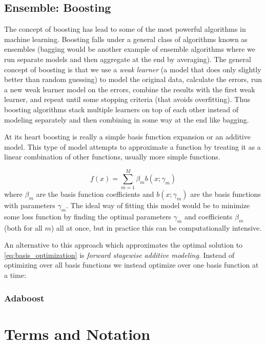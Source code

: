 \documentclass[paper=a4, fontsize=11pt]{scrartcl} %
\numberwithin{equation}{section} %
\numberwithin{figure}{section} %
\numberwithin{table}{section} %
\begin{document}
\subsection{Ensemble: Boosting}

The concept of boosting has lead to some of the most powerful algorithms in machine learning. Boosting falls under a general class of algorithms known as ensembles (bagging would be another example of ensemble algorithms where we run separate models and then aggregate at the end by averaging). The general concept of boosting is that we use a \emph{weak learner} (a model that does only slightly better than random guessing) to model the original data, calculate the errors, run a new weak learner model on the errors, combine the results with the first weak learner, and repeat until some stopping criteria (that avoids overfitting). Thus boosting algorithms stack multiple learners on top of each other instead of modeling separately and then combining in some way at the end like bagging.

At its heart boosting is really a simple basis function expansion or an additive model. This type of model attempts to approximate a function by treating it as a linear combination of other functions, usually more simple functions. 

\begin{equation} \label{eq:basis_optimization}
f(x) = \sum^{M}_{m=1} {\beta_m b(x; \gamma_m)}
\end{equation}
where $\beta_m$ are the basis function coefficients and $b(x; \gamma_m)$ are the basis functions with parameters $\gamma_m$. 
The ideal way of fitting this model would be to minimize some loss function by finding the optimal parameters $\gamma_m$ and coefficients $\beta_m$ (both for all $m$) all at once, but in practice this can be computationally intensive. 

An alternative to this approach which approximates the optimal solution to \ref{eq:basis_optimization} is \emph{forward stagewise additive modeling}. Instead of optimizing over all basis functions we instead optimize over one basis function at a time:



\subsubsection{Adaboost}


\section{Terms and Notation}
\end{document}

